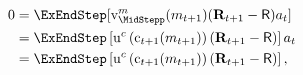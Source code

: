   \begin{equation}\begin{gathered}\begin{aligned}
        0  & = \ExEndStep[{\vFunc}_{\MidStepp}^{{m}}({m}_{t+1})(\Risky_{t+1}-\Rfree){a}_{t}] \notag
        \\         & = \ExEndStep\left[\uFunc^{{c}}\left(\cFunc_{t+1}({m}_{t+1})\right)(\Risky_{t+1}-\Rfree)\right]{a}_{t}
        \\         & = \ExEndStep\left[\uFunc^{{c}}\left(\cFunc_{t+1}({m}_{t+1})\right)(\Risky_{t+1}-\Rfree)\right], \label{eq:FOCw}
      \end{aligned}\end{gathered}\end{equation}
